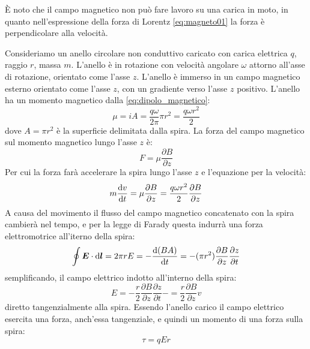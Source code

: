 \begin{Es}
  È noto che il campo magnetico non può fare lavoro su una carica in moto, in quanto nell'espressione della forza di Lorentz \eqref{eq:magneto01} la forza è perpendicolare alla velocità.

  Consideriamo un anello circolare non conduttivo caricato con carica elettrica $q$, raggio $r$, massa $m$. L'anello è in rotazione con velocità angolare $\omega$ attorno all'asse di rotazione, orientato come l'asse $z$. L'anello è immerso in un campo magnetico esterno orientato come l'asse $z$, con un gradiente verso l'asse $z$ positivo. L'anello ha un momento magnetico dalla \eqref{eq:dipolo_magnetico}:
  \begin{equation}
    \mu = iA = \frac{q\omega}{2\pi} \pi r^2 = \frac{q\omega r^2}{2}
  \end{equation}
  dove $A=\pi r^2$ è la superficie delimitata dalla spira. La forza del campo magnetico sul momento magnetico lungo l'asse $z$ è:
  \begin{equation}
    F = \mu\frac{\partial B}{\partial z}
  \end{equation}
  Per cui la forza farà accelerare la spira lungo l'asse $z$ e l'equazione per la velocità:
  \begin{equation}
    m\frac{\mathrm{d} v}{\mathrm{d} t} = \mu\frac{\partial B}{\partial z} = \frac{q\omega r^2}{2}\frac{\partial B}{\partial z}
    \label{eq:sg1}
  \end{equation}
  A causa del movimento il flusso del campo magnetico concatenato con la spira cambierà nel tempo, e per la legge di Farady questa indurrà una forza elettromotrice all'iterno della spira:
  \begin{equation}
    \oint \boldsymbol{E}\cdot \mathrm{d}\boldsymbol{l} = 2\pi r E = -\frac{\mathrm{d} (B A)}{\mathrm{d} t} = -(\pi r^2)\frac{\partial B}{\partial z}\frac{\partial z}{\partial t}
  \end{equation}
  semplificando, il campo elettrico indotto all'interno della spira:
  \begin{equation}
    E = -\frac{r}{2}\frac{\partial B}{\partial z}\frac{\partial z}{\partial t}-=\frac{r}{2}\frac{\partial B}{\partial z}v
  \end{equation}
  diretto tangenzialmente alla spira. Essendo l'anello carico il campo elettrico esercita una forza, anch'essa tangenziale, e quindi un momento di una forza sulla spira:
  \begin{equation}
    \tau = q E r
  \end{equation}

\end{Es}
